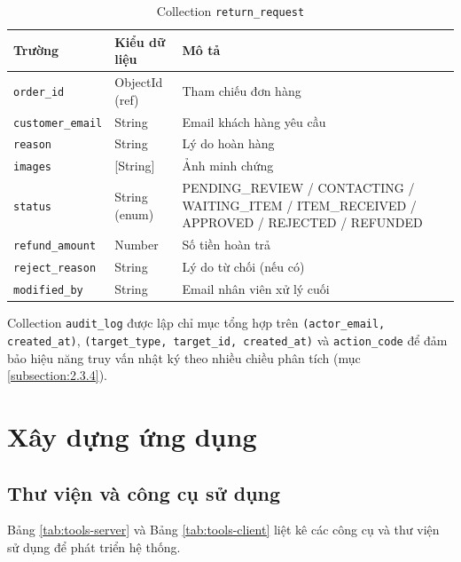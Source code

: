 \documentclass[../DoAn.tex]{subfiles}
\begin{document}
\begin{table}[H]
\centering
\caption{Collection \texttt{return\_request}}
\label{tab:col-return}
\scriptsize
\begin{tabular}{|p{3.5cm}|p{3cm}|p{6cm}|}
\hline
\textbf{Trường} & \textbf{Kiểu dữ liệu} & \textbf{Mô tả} \\
\hline
\texttt{order\_id} & ObjectId (ref) & Tham chiếu đơn hàng \\
\hline
\texttt{customer\_email} & String & Email khách hàng yêu cầu \\
\hline
\texttt{reason} & String & Lý do hoàn hàng \\
\hline
\texttt{images} & [String] & Ảnh minh chứng \\
\hline
\texttt{status} & String (enum) & PENDING\_REVIEW / CONTACTING \break /  WAITING\_ITEM / ITEM\_RECEIVED \break / APPROVED / REJECTED / REFUNDED \\
\hline
\texttt{refund\_amount} & Number & Số tiền hoàn trả \\
\hline
\texttt{reject\_reason} & String & Lý do từ chối (nếu có) \\
\hline
\texttt{modified\_by} & String & Email nhân viên xử lý cuối \\
\hline
\end{tabular}
\end{table}

Collection \texttt{audit\_log} được lập chỉ mục tổng hợp trên
\texttt{(actor\_email, created\_at)}, \texttt{(target\_type, target\_id,
created\_at)} và \break \texttt{action\_code} để đảm bảo hiệu năng truy vấn nhật ký
theo nhiều chiều phân tích (mục \ref{subsection:2.3.4}).

\section{Xây dựng ứng dụng}
\label{section:4.3}

\subsection{Thư viện và công cụ sử dụng}
\label{subsection:4.3.1}

Bảng \ref{tab:tools-server} và Bảng \ref{tab:tools-client} liệt kê các công
cụ và thư viện sử dụng để phát triển hệ thống.
\end{document}
